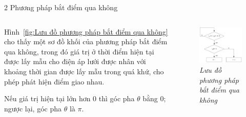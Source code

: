 \documentclass[11pt]{beamer}
\renewcommand{\label}[1]{%
			\gdef\sfname{sf:##1}}%
\begin{document}
	\begin{frame}[t]{2 Phương pháp bắt điểm qua không}
		\begin{columns}
			
			\begin{column}{0.5\textwidth}
				\justifying
				\vspace{5pt}
				
				Hình~\ref{fig:Lưu đồ phương pháp bắt điểm qua không} cho thấy một sơ đồ khối của phương pháp bắt điểm qua không, trong đó giá trị ở thời điểm hiện tại được lấy mẫu cho điện áp lưới được nhân với khoảng thời gian được lấy mẫu trong quá khứ, cho phép phát hiện điểm giao nhau.
				\vspace{0.8cm}
				
				Nếu giá trị hiện tại lớn hơn 0 thì góc pha $\theta$ bằng 0; ngược lại, góc pha $\theta$ là $\pi$.
				
			\end{column}
			
			\begin{column}{0.5\textwidth}  %
				\begin{center}
					
					\begin{figure}[h]
						\includegraphics[width=1\textwidth]{Fig. 2 Flowchart of zero-cross-detection method}
						\caption{\centering \textit{Lưu đồ phương pháp bắt điểm qua không}}
						\label{fig:Lưu đồ phương pháp bắt điểm qua không}
					\end{figure}	
				\end{center}
			\end{column}			
		\end{columns}
	\end{frame}
\end{document}
